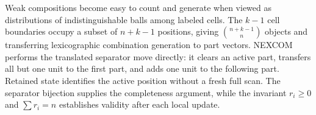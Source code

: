 \documentclass[10pt,letterpaper]{article}
\begin{document}
\begin{tcolorbox}[colback=Ink!4,colframe=Ink,title=Cornell summary]
Weak compositions become easy to count and generate when viewed as distributions of indistinguishable balls among labeled cells. The $k-1$ cell boundaries occupy a subset of $n+k-1$ positions, giving $\binom{n+k-1}{n}$ objects and transferring lexicographic combination generation to part vectors. NEXCOM performs the translated separator move directly: it clears an active part, transfers all but one unit to the first part, and adds one unit to the following part. Retained state identifies the active position without a fresh full scan. The separator bijection supplies the completeness argument, while the invariant $r_i\ge0$ and $\sum r_i=n$ establishes validity after each local update.
\end{tcolorbox}
\end{document}
